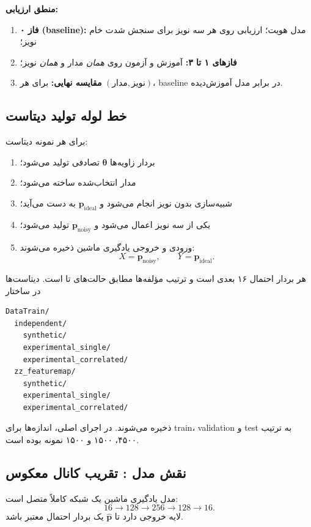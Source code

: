 \textbf{منطق ارزیابی:}
\begin{enumerate}
	\item \textbf{فاز ۰ (baseline):} مدل هویت؛ ارزیابی روی هر سه نویز برای سنجش شدت خام نویز؛
	\item \textbf{فازهای ۱ تا ۳:} آموزش و آزمون روی \emph{همان} مدار و \emph{همان} نویز؛
	\item \textbf{مقایسه نهایی:} برای هر $(\text{مدار}, \text{نویز})$، baseline در برابر مدل آموزش‌دیده.
\end{enumerate}

\subsection{خط لوله تولید دیتاست}

برای هر نمونه دیتاست:
\begin{enumerate}
	\item بردار زاویه‌ها $\boldsymbol{\theta}$ تصادفی تولید می‌شود؛
	\item مدار انتخاب‌شده ساخته می‌شود؛
	\item شبیه‌سازی بدون نویز انجام می‌شود و $\mathbf{p}_{\mathrm{ideal}}$ به دست می‌آید؛
	\item یکی از سه نویز اعمال می‌شود و $\mathbf{p}_{\mathrm{noisy}}$ تولید می‌شود؛
	\item ورودی و خروجی یادگیری ماشین ذخیره می‌شوند:
	\[
		X=\mathbf{p}_{\mathrm{noisy}},\qquad
		Y=\mathbf{p}_{\mathrm{ideal}}.
	\]
\end{enumerate}
هر بردار احتمال ۱۶ بعدی است و ترتیب مؤلفه‌ها مطابق حالت‌های  تا  است. دیتاست‌ها در ساختار
\begin{latin}
\begin{verbatim}
DataTrain/
  independent/
    synthetic/
    experimental_single/
    experimental_correlated/
  zz_featuremap/
    synthetic/
    experimental_single/
    experimental_correlated/
\end{verbatim}
\end{latin}
ذخیره می‌شوند. در اجرای اصلی، اندازه‌ها برای train، validation و test به ترتیب ۴۵۰۰، ۱۵۰۰ و ۱۵۰۰ نمونه بوده است.

\subsection{نقش مدل : تقریب کانال معکوس}

مدل یادگیری ماشین یک شبکه کاملاً متصل است:
\[
	16 \rightarrow 128 \rightarrow 256 \rightarrow 128 \rightarrow 16.
\]
لایه خروجی  دارد تا $\hat{\mathbf{p}}$ یک بردار احتمال معتبر باشد.

